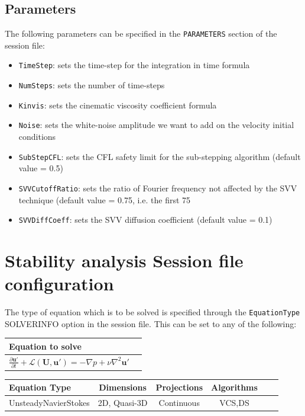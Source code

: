 \subsection{Parameters}
 The following parameters can be specified in the \texttt{PARAMETERS} section of the session file: 
 
 \begin{itemize}
\item \texttt{TimeStep}: sets the time-step for the integration in time formula
\item  \texttt{NumSteps}: sets the number of time-steps
\item  \texttt{Kinvis}: sets the cinematic viscosity coefficient formula
\item  \texttt{Noise}: sets the white-noise amplitude we want to add on the velocity initial conditions
\item  \texttt{SubStepCFL}: sets the CFL safety limit for the sub-stepping algorithm (default value = 0.5)
\item  \texttt{SVVCutoffRatio}: sets the ratio of Fourier frequency not affected by the SVV technique (default value = 0.75, i.e. the first 75%
\item  \texttt{SVVDiffCoeff}: sets the SVV diffusion coefficient (default value = 0.1) 
 \end{itemize}


\section{Stability analysis Session file configuration}

 The type of equation which is to be solved is specified through the \texttt {EquationType} SOLVERINFO option in the session file. This can be set to any of the following: 

\begin{table}
\begin{center}
\begin{tabular}{|l|c|} \hline
{Equation to solve}  \\ \hline
$\frac{\partial\mathbf{u'}}{\partial t} +\mathcal{L}(\mathbf{U},\mathbf{u'})=-\nabla p+\nu \nabla^2 \mathbf{u'}$\\ \hline
\end{tabular}
\end{center}
\end{table}


\begin{table}
\begin{center}
\begin{tabular}{|l|c|c|c|c|c|} \hline
{Equation Type} & {Dimensions} &{Projections} &{Algorithms} \\ \hline
UnsteadyNavierStokes & 2D, Quasi-3D& Continuous &VCS,DS\\ \hline
\end{tabular}
\end{center}
\end{table}

